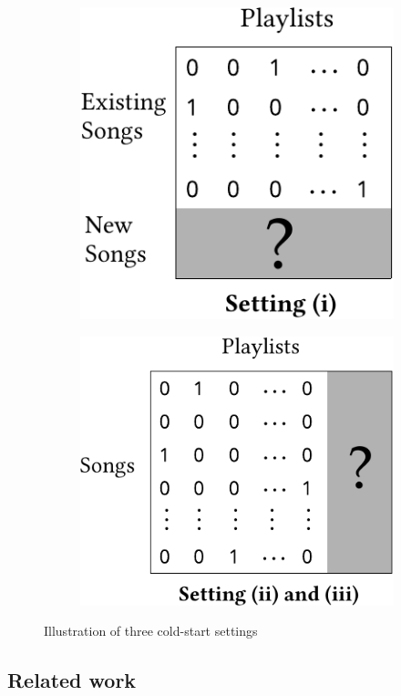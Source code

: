 \begin{figure}[t]
\begin{subfigure}{.5\columnwidth}
  \centering
  \includegraphics[width=.73\linewidth]{fig/fig_nsr.pdf}
  \label{fig:nsr}
\end{subfigure}%
\begin{subfigure}{.5\columnwidth}
  \centering
  \includegraphics[width=.85\linewidth]{fig/fig_gen.pdf}
  \label{fig:gen}
\end{subfigure}
\caption{Illustration of three cold-start settings}
\label{fig:settings}
\end{figure}



\subsection{Related work}


